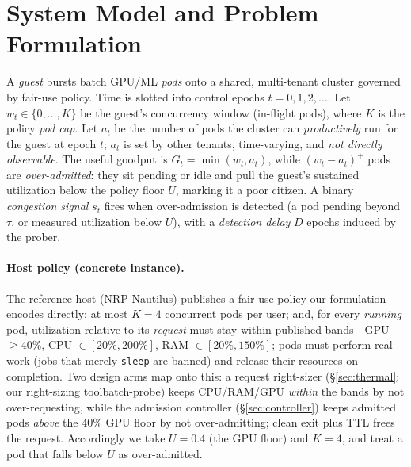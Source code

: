 
\section{System Model and Problem Formulation}
\label{sec:model}

A \emph{guest} bursts batch GPU/ML \emph{pods} onto a shared, multi-tenant
cluster governed by fair-use policy. Time is slotted into control epochs
$t=0,1,2,\dots$. Let $w_t\in\{0,\dots,K\}$ be the guest's concurrency window
(in-flight pods), where $K$ is the policy \emph{pod cap}. Let $a_t$ be the number
of pods the cluster can \emph{productively} run for the guest at epoch $t$; $a_t$
is set by other tenants, time-varying, and \emph{not directly observable}. The
useful goodput is $G_t=\min(w_t,a_t)$, while $(w_t-a_t)^{+}$ pods are
\emph{over-admitted}: they sit pending or idle and pull the guest's sustained
utilization below the policy floor $U$, marking it a poor citizen. A binary
\emph{congestion signal} $s_t$ fires when over-admission is detected (a pod
pending beyond $\tau$, or measured utilization below $U$), with a
\emph{detection delay} $D$ epochs induced by the prober.

\paragraph{Host policy (concrete instance).}
The reference host (NRP Nautilus) publishes a fair-use policy our formulation
encodes directly: at most \emph{$K=4$} concurrent pods per user; and, for every
\emph{running} pod, utilization relative to its \emph{request} must stay within
published bands---GPU $\ge 40\%$, CPU $\in[20\%,200\%]$, RAM $\in[20\%,150\%]$;
pods must perform real work (jobs that merely \texttt{sleep} are banned) and
release their resources on completion. Two design arms map onto this: a request
right-sizer (\S\ref{sec:thermal}; \ifblind our right-sizing tool\else batch-probe\fi) keeps CPU/RAM/GPU \emph{within} the
bands by not over-requesting, while the admission controller (\S\ref{sec:controller})
keeps admitted pods \emph{above} the $40\%$ GPU floor by not over-admitting; clean
exit plus TTL frees the request. Accordingly we take $U=0.4$ (the GPU floor) and
$K=4$, and treat a pod that falls below $U$ as over-admitted.

